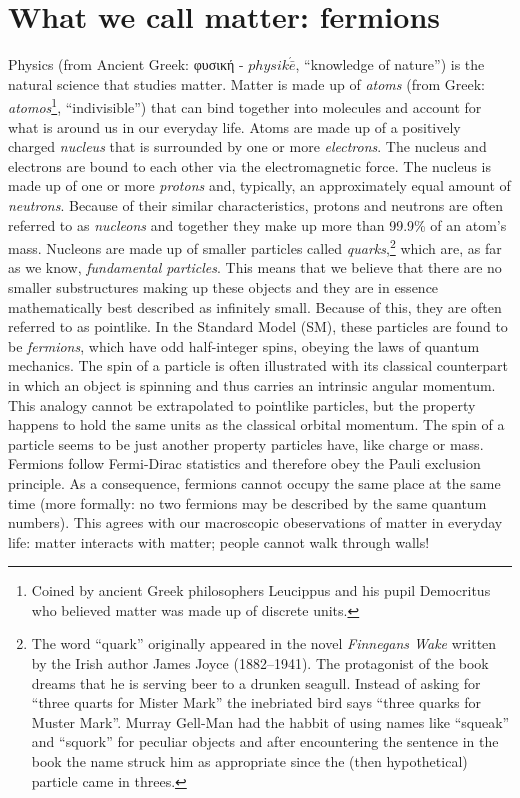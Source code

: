 \section{What we call matter: fermions}
\label{sec:fermions}
Physics (from Ancient Greek: \gr φυσική \en - $physik\acute{\bar{e}}$, ``knowledge of nature'') is the natural science that studies matter.
Matter is made up of \textit{atoms} (from Greek: \textit{atomos}\footnote{Coined by ancient Greek philosophers Leucippus and his pupil Democritus who believed matter was made up of discrete units.}, ``indivisible'') that can bind together into molecules and account for what is around us in our everyday life.
Atoms are made up of a positively charged \textit{nucleus} that is surrounded by one or more \textit{electrons}. The nucleus and electrons are bound to each other via the electromagnetic force.
The nucleus is made up of one or more \textit{protons} and, typically, an approximately equal amount of \textit{neutrons}. Because of their similar characteristics, protons and neutrons are often referred to as \textit{nucleons} and together they make up more than 99.9\% of an atom's mass.
Nucleons are made up of smaller particles called \textit{quarks},\footnote{The word ``quark'' originally appeared in the novel \textit{Finnegans Wake} written by the Irish author James Joyce (1882–1941). The protagonist of the book dreams that he is serving beer to a drunken seagull. Instead of asking for ``three quarts for Mister Mark'' the inebriated bird says ``three quarks for Muster Mark''. Murray Gell-Man had the habbit of using names like ``squeak'' and ``squork'' for peculiar objects and after encountering the sentence in the book the name struck him as appropriate since the (then hypothetical) particle came in threes.} which are, as far as we know, \textit{fundamental particles}. This means that we believe that there are no smaller substructures making up these objects and they are in essence mathematically best described as infinitely small.
Because of this, they are often referred to as pointlike.
In the Standard Model (SM), these particles are found to be \textit{fermions}, which have odd half-integer spins, obeying the laws of quantum mechanics.
The spin of a particle is often illustrated with its classical counterpart in which an object is spinning and thus carries an intrinsic angular momentum.
This analogy cannot be extrapolated to pointlike particles, but the property happens to hold the same units as the classical orbital momentum.
The spin of a particle seems to be just another property particles have, like charge or mass.
Fermions follow Fermi-Dirac statistics and therefore obey the Pauli exclusion principle. As a consequence, fermions cannot occupy the same place at the same time (more formally: no two fermions may be described by the same quantum numbers). This agrees with our macroscopic obeservations of matter in everyday life: matter interacts with matter; people cannot walk through walls!

